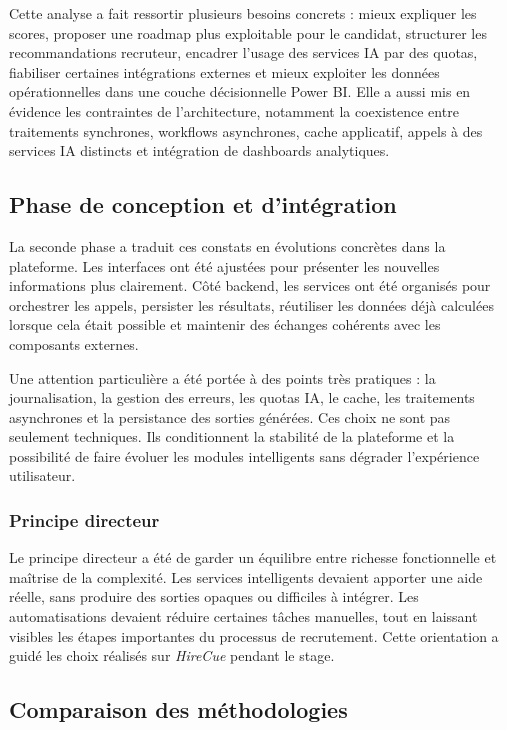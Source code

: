 Cette analyse a fait ressortir plusieurs besoins concrets : mieux expliquer les scores, proposer une roadmap plus exploitable pour le candidat, structurer les recommandations recruteur, encadrer l'usage des services IA par des quotas, fiabiliser certaines intégrations externes et mieux exploiter les données opérationnelles dans une couche décisionnelle Power BI. Elle a aussi mis en évidence les contraintes de l'architecture, notamment la coexistence entre traitements synchrones, workflows asynchrones, cache applicatif, appels à des services IA distincts et intégration de dashboards analytiques.

\subsection{Phase de conception et d'intégration}

La seconde phase a traduit ces constats en évolutions concrètes dans la plateforme. Les interfaces ont été ajustées pour présenter les nouvelles informations plus clairement. Côté backend, les services ont été organisés pour orchestrer les appels, persister les résultats, réutiliser les données déjà calculées lorsque cela était possible et maintenir des échanges cohérents avec les composants externes.

Une attention particulière a été portée à des points très pratiques : la journalisation, la gestion des erreurs, les quotas IA, le cache, les traitements asynchrones et la persistance des sorties générées. Ces choix ne sont pas seulement techniques. Ils conditionnent la stabilité de la plateforme et la possibilité de faire évoluer les modules intelligents sans dégrader l'expérience utilisateur.

\subsubsection{Principe directeur}

Le principe directeur a été de garder un équilibre entre richesse fonctionnelle et maîtrise de la complexité. Les services intelligents devaient apporter une aide réelle, sans produire des sorties opaques ou difficiles à intégrer. Les automatisations devaient réduire certaines tâches manuelles, tout en laissant visibles les étapes importantes du processus de recrutement. Cette orientation a guidé les choix réalisés sur \textit{HireCue} pendant le stage.

\subsection{Comparaison des méthodologies}

